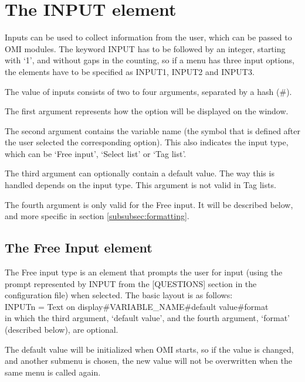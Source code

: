 \documentclass[a4paper]{book}
\newcommand{\vs}{\vspace{3mm}}
\renewcommand{\indent}{\hspace*{5mm}}
\begin{document}
\section{The INPUT element}
\label{subsec:mylabel5}

Inputs can be used to collect information from the user, which can be passed 
to OMI modules. The keyword \textsf{INPUT} has to be followed by an integer, starting 
with `1', and without gaps in the counting, so if a menu has three input 
options, the elements have to be specified as \textsf{INPUT1}, \textsf{INPUT2} and \textsf{INPUT3}.

\vs

The value of inputs consists of two to four arguments, separated by a hash 
(\textsf{{\#}}).

The first argument represents how the option will be displayed on the 
window.

The second argument contains the variable name (the symbol that is defined 
after the user selected the corresponding option). This also indicates the 
input type, which can be `Free input', `Select list' 
or `Tag list'.

The third argument can optionally contain a default value. The way this is 
handled depends on the input type. This argument is not valid in Tag 
lists.

The fourth argument is only valid for the Free input. It will be 
described below, and more specific in section \ref{subsubsec:formatting}.

\subsection{The Free Input element}
\label{subsubsec:mylabel37}

The Free input type is an element that prompts the user for input (using 
the prompt represented by \textsf{INPUT} from the \textsf{[QUESTIONS]} section in the 
configuration file) when selected. The basic layout is as follows:\\
\indent\textsf{INPUTn = Text on display{\#}VARIABLE{\_}NAME{\#}default value{\#}format} \\
in which the third argument, `default value', and the fourth argument, 
`format' (described below), are optional.

The default value will be initialized when OMI starts, so if the value is 
changed, and another submenu is chosen, the new value will not be 
overwritten when the same menu is called again.
\end{document}
